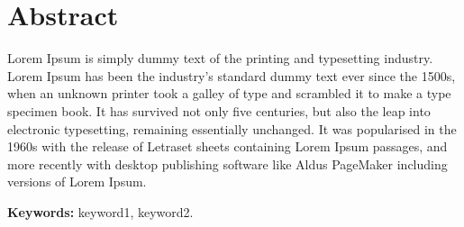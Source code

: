 \chapter*{Abstract}

Lorem Ipsum is simply dummy text of the printing and typesetting industry. Lorem Ipsum has been the industry's standard dummy text ever since the 1500s, when an unknown printer took a galley of type and scrambled it to make a type specimen book. It has survived not only five centuries, but also the leap into electronic typesetting, remaining essentially unchanged. It was popularised in the 1960s with the release of Letraset sheets containing Lorem Ipsum passages, and more recently with desktop publishing software like Aldus PageMaker including versions of Lorem Ipsum.

\vfill
\textbf{Keywords:} keyword1, keyword2.
\clearpage